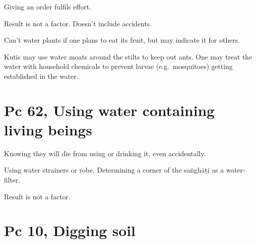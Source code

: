 Giving an order fulfils effort.

Result is not a factor. Doesn't include accidents.

Can't water plants if one plans to eat its fruit, but may indicate it
for others.

Kutis may use water moats around the stilts to keep out ants. One may
treat the water with household chemicals to prevent larvae
(e.g.~mosquitoes) getting established in the water.

\section{Pc 62, Using water containing living beings}

\enlargethispage{\baselineskip}

Knowing they will die from using or drinking it, even accidentally.

Using water strainers or robe. Determining a corner of the saṅghāṭi as a
water-filter.

Result is not a factor.

\clearpage

\section{Pc 10, Digging soil}

